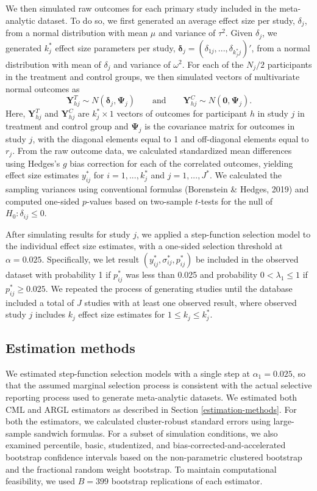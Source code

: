 \documentclass[
  man, donotrepeattitle,floatsintext]{apa7}
\begin{document}
We then simulated raw outcomes for each primary study included in the
meta-analytic dataset. To do so, we first generated an average effect
size per study, \(\delta_j\), from a normal distribution with mean \(\mu\) and variance
of \(\tau^2\). Given \(\delta_j\), we generated \(k_j^*\) effect size parameters per study, \(\boldsymbol\delta_j = \left(\delta_{1j},...,\delta_{k_j^* j}\right)'\), from a normal distribution with mean of \(\delta_j\) and
variance of \(\omega^2\).
For each of the \(N_j / 2\) participants in the treatment and control groups, we then simulated vectors of multivariate normal outcomes as
\[
\mathbf{Y}_{hj}^T \sim N(\boldsymbol\delta_j, \boldsymbol\Psi_j) \qquad \text{and} \qquad
\mathbf{Y}_{hj}^C \sim N(\mathbf{0}, \boldsymbol\Psi_j).
\]
Here, \(\mathbf{Y}_{hj}^T\) and \(\mathbf{Y}_{hj}^C\) are
\(k_j^* \times 1\) vectors of outcomes for participant \(h\) in study \(j\) in
treatment and control group and \(\boldsymbol\Psi_j\) is the covariance matrix for outcomes in study \(j\), with the diagonal elements equal to 1 and off-diagonal elements equal to \(r_j\).
From the raw outcome data, we calculated standardized mean
differences using Hedges's \(g\) bias correction for each of the correlated outcomes, yielding effect size estimates \(y^*_{ij}\) for \(i=1,...,k_j^*\) and \(j = 1,...,J^*\).
We calculated the sampling variances using conventional formulas (Borenstein \& Hedges, 2019) and computed one-sided \(p\)-values based on two-sample \(t\)-tests for the null of \(H_0: \delta_{ij} \leq 0\).

After simulating results for study \(j\), we applied a step-function selection
model to the individual effect size estimates, with a one-sided selection
threshold at \(\alpha = 0.025\). Specifically, we let result \((y^*_{ij},
\sigma_{ij}^*, p_{ij}^*)\) be included in the observed dataset with probability
1 if \(p_{ij}^*\) was less than 0.025 and probability \(0 < \lambda_1 \leq 1\) if \(p_{ij}^* \ge 0.025\).
We repeated the process of generating studies until the database included a total of \(J\) studies with at least one observed result, where observed study \(j\) includes \(k_j\) effect size estimates for \(1 \leq k_j \leq k_j^*\).

\subsection{Estimation methods}\label{estimation-methods-1}

We estimated step-function selection models with a single step at \(\alpha_1 = 0.025\), so that the assumed marginal selection process is consistent with the actual selective reporting process used to generate meta-analytic datasets.
We estimated both CML and ARGL estimators as described in Section \ref{estimation-methods}.
For both the estimators, we calculated cluster-robust standard errors using large-sample sandwich formulas.
For a subset of simulation conditions, we also examined percentile, basic, studentized, and bias-corrected-and-accelerated bootstrap confidence intervals based on the non-parametric clustered bootstrap and the fractional random weight bootstrap.
To maintain computational feasibility, we used \(B = 399\) bootstrap replications of each estimator.
\end{document}
